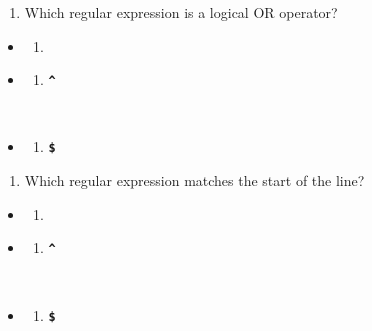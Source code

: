 \documentclass[
  letterpaper,
  DIV=11,
  numbers=noendperiod]{scrreprt}
\providecommand{\tightlist}{%
  \setlength{\itemsep}{0pt}\setlength{\parskip}{0pt}}\usepackage{longtable,booktabs,array}
\begin{document}
\begin{enumerate}
\def\labelenumi{\arabic{enumi}.}
\setcounter{enumi}{10}
\tightlist
\item
  Which regular expression is a logical OR operator?
\end{enumerate}

\begin{itemize}
\item
  \begin{enumerate}
  \def\labelenumi{(\Alph{enumi})}
  \tightlist
  \item
    \textbf{\texttt{\textbar{}}}\strut \\
  \end{enumerate}
\item
  \begin{enumerate}
  \def\labelenumi{(\Alph{enumi})}
  \setcounter{enumi}{1}
  \tightlist
  \item
    \textbf{\texttt{\^{}}}\strut \\
  \end{enumerate}
\item
  \begin{enumerate}
  \def\labelenumi{(\Alph{enumi})}
  \setcounter{enumi}{2}
  \tightlist
  \item
    \textbf{\texttt{\$}}
  \end{enumerate}
\end{itemize}

\begin{enumerate}
\def\labelenumi{\arabic{enumi}.}
\setcounter{enumi}{11}
\tightlist
\item
  Which regular expression matches the start of the line?
\end{enumerate}

\begin{itemize}
\item
  \begin{enumerate}
  \def\labelenumi{(\Alph{enumi})}
  \tightlist
  \item
    \textbf{\texttt{\textbar{}}}\strut \\
  \end{enumerate}
\item
  \begin{enumerate}
  \def\labelenumi{(\Alph{enumi})}
  \setcounter{enumi}{1}
  \tightlist
  \item
    \textbf{\texttt{\^{}}}\strut \\
  \end{enumerate}
\item
  \begin{enumerate}
  \def\labelenumi{(\Alph{enumi})}
  \setcounter{enumi}{2}
  \tightlist
  \item
    \textbf{\texttt{\$}}
  \end{enumerate}
\end{itemize}
\end{document}
